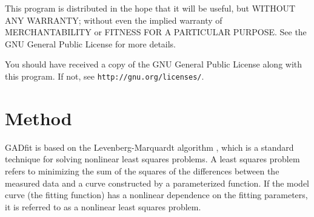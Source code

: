 \documentclass{article}
\begin{document}
This program is distributed in the hope that it will be useful, but WITHOUT ANY WARRANTY; without even the implied warranty of MERCHANTABILITY or FITNESS FOR A PARTICULAR PURPOSE. See the GNU General Public License for more details.

You should have received a copy of the GNU General Public License along with this program.  If not, see \texttt{http://gnu.org/licenses/}.

\section{Method}

GADfit is based on the Levenberg-Marquardt algorithm \cite{marquardt63}, which is a standard technique for solving nonlinear least squares problems. A least squares problem refers to minimizing the sum of the squares of the differences between the measured data and a curve constructed by a parameterized function. If the model curve (the fitting function) has a nonlinear dependence on the fitting parameters, it is referred to as a nonlinear least squares problem.
\end{document}
